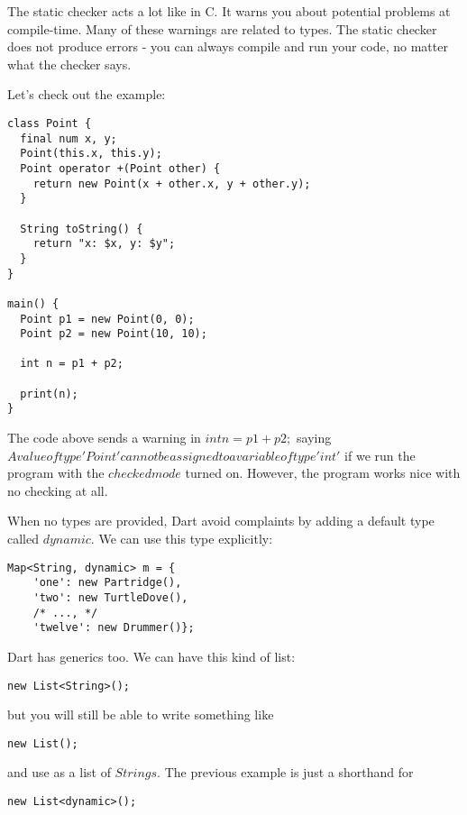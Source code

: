 The static checker acts a lot like in C. It warns you about potential  problems
at compile-time. Many of these warnings are related to types. The static checker
does not produce errors - you can always compile and run your code, no matter
what the checker says.

Let's check out the example:

\begin{lstlisting}[label=dpoint,caption=Dart Warning Example]
class Point {
  final num x, y;
  Point(this.x, this.y);
  Point operator +(Point other) {
    return new Point(x + other.x, y + other.y);
  }

  String toString() {
    return "x: $x, y: $y";
  }
}

main() {
  Point p1 = new Point(0, 0);
  Point p2 = new Point(10, 10);

  int n = p1 + p2;

  print(n);
}
\end{lstlisting}

The code above sends a warning in $int n = p1 + p2;$ saying  $A value of
type 'Point' cannot be assigned to a variable of type 'int'$ if we run the
program with the $checked mode$ turned on. However, the program works nice with
no checking at all.

When no types are provided, Dart avoid complaints by adding a default type
called $dynamic$. We can use this type explicitly:

\begin{lstlisting}[label=dartMap,caption=Dart dynamic type]
Map<String, dynamic> m = {
    'one': new Partridge(),
    'two': new TurtleDove(),
    /* ..., */
    'twelve': new Drummer()};
\end{lstlisting}

Dart has generics too. We can have this kind of list:

\begin{verbatim}
new List<String>();
\end{verbatim}

but you will still be able to write something like

\begin{verbatim}
new List();
\end{verbatim}

and use as a list of $Strings$. The previous example is just a shorthand for

\begin{verbatim}
new List<dynamic>();
\end{verbatim}

